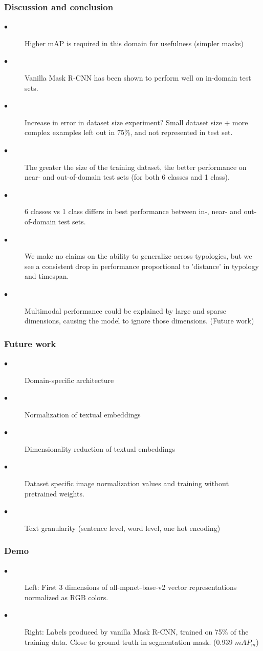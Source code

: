 \documentclass[aspectratio=1610]{beamer}
\begin{document}
\begin{frame}
  \frametitle{Discussion and conclusion}
\begin{description}
\item[$\bullet$] Higher mAP is required in this domain for usefulness (simpler masks)
\item[$\bullet$] Vanilla Mask R-CNN has been shown to perform well on in-domain test sets.
\item[$\bullet$] Increase in error in dataset size experiment? Small dataset size + more complex examples left out in 75\%, and not represented in test set. 
\item[$\bullet$]The greater the size of the training dataset, the better performance on near- and out-of-domain test sets (for both 6 classes and 1 class).
\item[$\bullet$] 6 classes vs 1 class differs in best performance between in-, near- and out-of-domain test sets.
\item[$\bullet$] We make no claims on the ability to generalize across typologies, but we see a consistent drop in performance proportional to 'distance' in typology and timespan.
\item[$\bullet$] Multimodal performance could be explained by large and sparse dimensions, causing the model to ignore those dimensions. (Future work)
\end{description}

\end{frame}
\normalpage

\begin{frame}
  \frametitle{Future work}
\begin{description}
\item[$\bullet$] Domain-specific architecture
\item[$\bullet$] Normalization of textual embeddings
\item[$\bullet$] Dimensionality reduction of textual embeddings
\item[$\bullet$] Dataset specific image normalization values and training without pretrained weights.
\item[$\bullet$] Text granularity (sentence level, word level, one hot encoding)
\end{description}

\end{frame}
\normalpage

\begin{frame}
  \frametitle{Demo}
\begin{description}
\item[$\bullet$] Left: First 3 dimensions of all-mpnet-base-v2 vector representations normalized as RGB colors.
\item[$\bullet$] Right: Labels produced by vanilla Mask R-CNN, trained on 75\% of the training data. Close to ground truth in segmentation mask. (0.939 $mAP_{m}$)
\end{description}

\end{frame}
\normalpage
\end{document}
